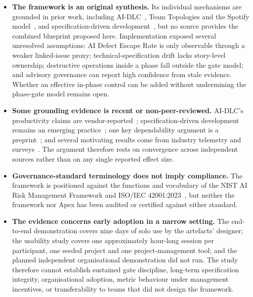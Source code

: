 \begin{itemize}[leftmargin=0.6cm, itemsep=0.4em]

\item \textbf{The framework is an original synthesis.} Its individual mechanisms are grounded in prior work, including \ac{AI-DLC}~\cite{AWS:2025aidlc}, Team Topologies and the Spotify model~\cite{Kniberg:2012sp, Skelton:2019tt}, and specification-driven development~\cite{Thoughtworks:2025SD, Farrag:2026sd}, but no source provides the combined blueprint proposed here. Implementation exposed several unresolved assumptions: AI Defect Escape Rate is only observable through a weaker linked-issue proxy; technical-specification drift lacks story-level ownership; destructive operations inside a phase fall outside the gate model; and advisory governance can report high confidence from stale evidence. Whether an effective in-phase control can be added without undermining the phase-gate model remains open.

\item \textbf{Some grounding evidence is recent or non-peer-reviewed.} \ac{AI-DLC}'s productivity claims are vendor-reported~\cite{AWS:2025aidlc}; specification-driven development remains an emerging practice~\cite{Thoughtworks:2025SD}; one key dependability argument is a preprint~\cite{Farrag:2026sd}; and several motivating results come from industry telemetry and surveys~\cite{DORA:2025ai, StackOverflow:2025dev, Faros:2025par, Veracode:2025gen}. The argument therefore rests on convergence across independent sources rather than on any single reported effect size.

\item \textbf{Governance-standard terminology does not imply compliance.} The framework is positioned against the functions and vocabulary of the \ac{NIST} \ac{AI} Risk Management Framework and ISO/IEC 42001:2023~\cite{NIST:2023rmf, ISO/IEC:2023ai}, but neither the framework nor Apex has been audited or certified against either standard.

\item \textbf{The evidence concerns early adoption in a narrow setting.} The end-to-end demonstration covers nine days of solo use by the artefacts' designer; the usability study covers one approximately hour-long session per participant, one seeded project and one project-management tool; and the planned independent organisational demonstration did not run. The study therefore cannot establish sustained gate discipline, long-term specification integrity, organisational adoption, metric behaviour under management incentives, or transferability to teams that did not design the framework.

\end{itemize}


